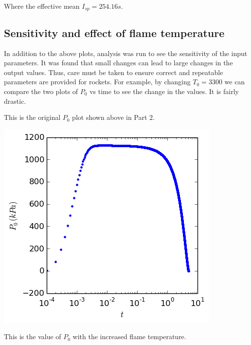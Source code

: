 \documentclass[cleanfoot,cleanhead,twocolumn,10pt,notitlepage]{asme2e}
\begin{document}
Where the effective mean $I_{sp}=254.16 s$.

\subsection{Sensitivity and effect of flame temperature}

In addition to the above plots, analysis was run to see the sensitivity of the input parameters.  It was found that small changes can lead to large changes in the output values.  Thus, care must be taken to ensure correct and repeatable parameters are provided for rockets. For example, by changing $T_0 = 3300$ we can compare the two plots of $P_0$ vs time to see the change in the values.  It is fairly drastic.  

This is the original $P_0$ plot shown above in Part 2.  

\includegraphics[width=\linewidth]{../python_stuff/Part2/P0.png}

This is the value of $P_0$ with the increased flame temperature.
\end{document}

